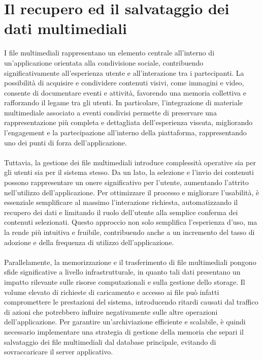 \chapter{Il recupero ed il salvataggio dei dati multimediali}

I file multimediali rappresentano un elemento centrale all’interno di un’applicazione orientata alla condivisione sociale,
contribuendo significativamente all’esperienza utente e all’interazione tra i partecipanti.
La possibilità di acquisire e condividere contenuti visivi, come immagini e video, consente di documentare eventi e attività,
favorendo una memoria collettiva e rafforzando il legame tra gli utenti.
In particolare, l’integrazione di materiale multimediale associato a eventi condivisi permette di preservare una rappresentazione più completa e dettagliata dell’esperienza vissuta,
migliorando l’engagement e la partecipazione all’interno della piattaforma, rappresentando uno dei punti di forza dell’applicazione.\\
\\
Tuttavia, la gestione dei file multimediali introduce complessità operative sia per gli utenti sia per il sistema stesso.
Da un lato, la selezione e l’invio dei contenuti possono rappresentare un onere significativo per l’utente, aumentando l’attrito nell’utilizzo dell’applicazione.
Per ottimizzare il processo e migliorare l’usabilità, è essenziale semplificare al massimo l’interazione richiesta,
automatizzando il recupero dei dati e limitando il ruolo dell’utente alla semplice conferma dei contenuti selezionati.
Questo approccio non solo semplifica l’esperienza d’uso, ma la rende più intuitiva e fruibile,
contribuendo anche a un incremento del tasso di adozione e della frequenza di utilizzo dell’applicazione.\\
\\
Parallelamente, la memorizzazione e il trasferimento di file multimediali pongono sfide significative a livello infrastrutturale,
in quanto tali dati presentano un impatto rilevante sulle risorse computazionali e sulla gestione dello storage.
Il volume elevato di richieste di caricamento e accesso ai file può infatti compromettere le prestazioni del sistema,
introducendo ritardi causati dal traffico di azioni che potrebbero influire negativamente sulle altre operazioni dell’applicazione.
Per garantire un’archiviazione efficiente e scalabile, è quindi necessario implementare una strategia di gestione della memoria
che separi il salvataggio dei file multimediali dal database principale, evitando di sovraccaricare il server applicativo.
